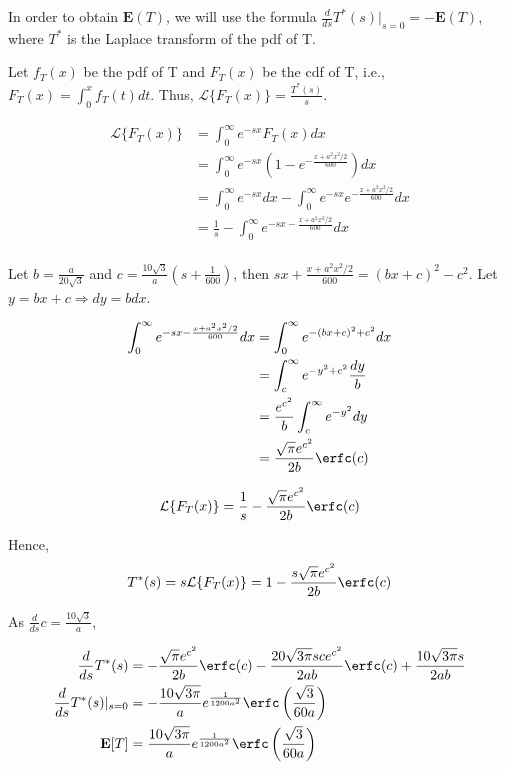 In order to obtain $\mathbf{E}(T)$, we will use the formula $\frac{d}{ds}T^*(s)|_{s=0} = -\mathbf{E}(T)$, where $T^*$ is the Laplace transform of the pdf of T.

Let $f_T(x)$ be the pdf of T and $F_T(x)$ be the cdf of T, i.e., $F_T(x) = \int_0^x f_T(t) dt$. Thus, $\mathcal{L}\{F_T(x)\} = \frac{T^*(s)}{s}$.

\begin{align*}
	\mathcal{L}\{F_T(x)\} &= \int_0^\infty e^{-sx} F_T(x) dx \\
		&= \int_0^\infty e^{-sx} \left( 1 - e^{-\frac{x + a^2x^2/2}{600}} \right) dx \\
		&= \int_0^\infty e^{-sx} dx - \int_0^\infty e^{-sx} e^{-\frac{x + a^2x^2/2}{600}} dx \\
		&= \frac{1}{s} - \int_0^\infty e^{-sx -\frac{x + a^2x^2/2}{600}} dx \\
\end{align*}

Let $b=\frac{a}{20\sqrt{3}}$ and $c = \frac{10\sqrt{3}}{a} \left( s + \frac{1}{600} \right)$, then $sx + \frac{x+a^2x^2/2}{600} = (bx + c)^2 - c^2$.
Let $y = bx+c \Rightarrow dy = bdx$.

\begin{align*}
	\int_0^\infty e^{-sx -\frac{x + a^2x^2/2}{600}} dx &= \int_0^\infty e^{-(bx+c)^2 + c^2} dx \\
		&= \int_c^\infty e^{-y^2 + c^2} \frac{dy}{b} \\
		&= \frac{e^{c^2}}{b} \int_c^\infty e^{-y^2} dy \\
		&= \frac{\sqrt{\pi}e^{c^2}}{2b} \erfc(c)
\end{align*}

$$ \mathcal{L}\{F_T(x)\} = \frac{1}{s} - \frac{\sqrt{\pi}e^{c^2}}{2b} \erfc(c) $$

Hence,
$$ T^*(s) = s \mathcal{L}\{F_T(x)\} = 1 - \frac{s\sqrt{\pi}e^{c^2}}{2b} \erfc(c) $$

As $\frac{d}{ds}c = \frac{10\sqrt{3}}{a}$,

\begin{align*}
\frac{d}{ds} T^*(s) &= - \frac{\sqrt{\pi}e^{c^2}}{2b} \erfc(c) - \frac{20\sqrt{3\pi} sc e^{c^2}}{2ab} \erfc(c) + \frac{10\sqrt{3\pi}s}{2ab} \\
\frac{d}{ds} T^*(s)|_{s=0} &= - \frac{10\sqrt{3\pi}}{a} e^{\frac{1}{1200a^2}} \erfc\left(\frac{\sqrt{3}}{60a}\right) \\
\mathbf{E}[T] &= \frac{10\sqrt{3\pi}}{a} e^{\frac{1}{1200a^2}} \erfc\left(\frac{\sqrt{3}}{60a}\right)
\end{align*}

